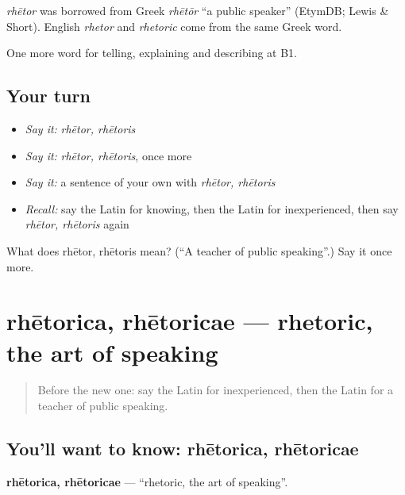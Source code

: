 \begin{cousinweb}
\emph{rhētor} was borrowed from Greek \emph{rhētōr} \textquotedblleft{}a public speaker\textquotedblright{} (EtymDB; Lewis \& Short). English \emph{rhetor} and \emph{rhetoric} come from the same Greek word.
\end{cousinweb}

\begin{grammarlens}[title={What you've built}]
One more word for telling, explaining and describing at B1.
\end{grammarlens}

\subsection*{Your turn}
\begin{itemize}
\raggedright
  \item \emph{Say it:} \emph{rhētor, rhētoris}
  \item \emph{Say it:} \emph{rhētor, rhētoris}, once more
  \item \emph{Say it:} a sentence of your own with \emph{rhētor, rhētoris}
  \item \emph{Recall:} say the Latin for knowing, then the Latin for inexperienced, then say \emph{rhētor, rhētoris} again
\end{itemize}

\begin{tcolorbox}[breakable,colback=teal!4,colframe=teal!35!black,title={Before you move on}]
What does rhētor, rhētoris mean? (\textquotedblleft{}A teacher of public speaking\textquotedblright{}.) Say it once more.
\end{tcolorbox}
\section[rhētorica, rhētoricae]{rhētorica, rhētoricae — rhetoric, the art of speaking}

\label{lesson:LA-C404-rhetorica}



\begin{quote}
Before the new one: say the Latin for inexperienced, then the Latin for a teacher of public speaking.
\end{quote}

\subsection*{You'll want to know: rhētorica, rhētoricae}
\textbf{rhētorica, rhētoricae} — \textquotedblleft{}rhetoric, the art of speaking\textquotedblright{}.

